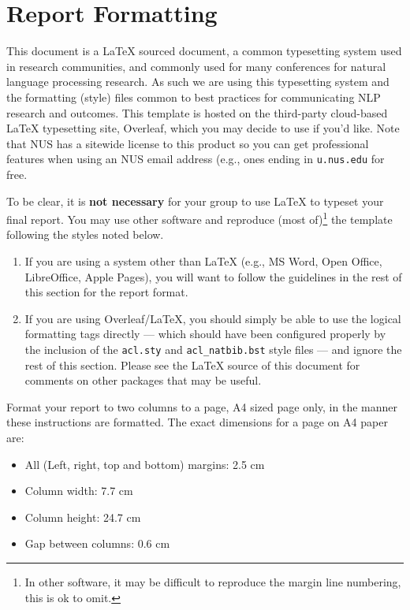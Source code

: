 \documentclass[11pt]{article}
\begin{document}

\section{Report Formatting}
\label{s:format}

This document is a \LaTeX{} sourced document, a common typesetting system used in research communities, and commonly used for many conferences for natural language processing research.  As such we are using this typesetting system and the formatting (style) files common to best practices for communicating NLP research and outcomes.  This template is hosted on the third-party cloud-based \LaTeX{} typesetting site, Overleaf, which you may decide to use if you'd like.  Note that NUS has a sitewide license to this product so you can get professional features when using an NUS email address (e.g., ones ending in {\tt u.nus.edu} for free.

To be clear, it is {\bf not necessary} for your group to use \LaTeX{} to typeset your final report.  You may use other software and reproduce (most of)\footnote{In other software, it may be difficult to reproduce the margin line numbering, this is ok to omit.} the template following the styles noted below.  

\begin{enumerate}
    \item If you are using a system other than \LaTeX{} (e.g., MS Word, Open Office, LibreOffice, Apple Pages), you will want to follow the guidelines in the rest of this section for the report format.  
    \item If you are using Overleaf/\LaTeX{}, you should simply be able to use the logical formatting tags directly --- which should have been configured properly by the inclusion of the {\tt acl.sty} and {\tt acl\_natbib.bst} style files --- and ignore the rest of this section. Please see the \LaTeX{} source of this document for comments on other packages that may be useful. 
\end{enumerate}

Format your report to two columns to a page, A4 sized page only, in the manner these instructions are formatted. The exact dimensions for a page on A4 paper are:

\begin{itemize}
\item All (Left, right, top and bottom) margins: 2.5 cm
\item Column width: 7.7 cm
\item Column height: 24.7 cm
\item Gap between columns: 0.6 cm
\end{itemize}
\end{document}

